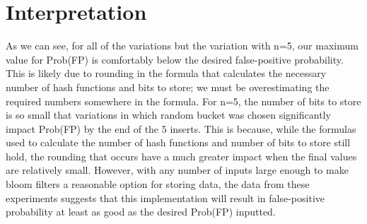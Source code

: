 \documentclass{article}
\begin{document}
\section*{Interpretation}
As we can see, for all of the variations but the variation with n=5, our maximum value for Prob(FP) is comfortably below the desired false-positive probability. This is likely due to rounding in the formula that calculates the necessary number of hash functions and bits to store; we must be overestimating the required numbers somewhere in the formula. For n=5, the number of bits to store is so small that variations in which random bucket was chosen significantly impact Prob(FP) by the end of the 5 inserts. This is because, while the formulas used to calculate the number of hash functions and number of bits to store still hold, the rounding that occurs have a much greater impact when the final values are relatively small. However, with any number of inputs large enough to make bloom filters a reasonable option for storing data, the data from these experiments suggests that this implementation will result in false-positive probability at least as good as the desired Prob(FP) inputted.
\end{document}

